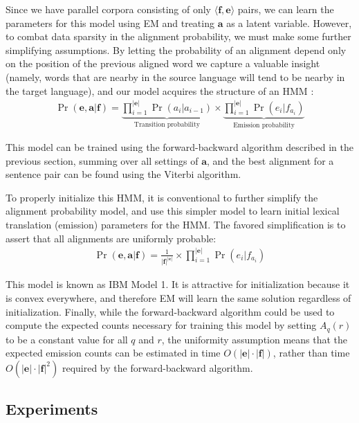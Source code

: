 \noindent Since we have parallel corpora consisting of only $\langle
\textbf{f}, \textbf{e} \rangle$ pairs, we can learn the parameters for
this model using EM and treating $\textbf{a}$ as a latent variable.
However, to combat data sparsity in the alignment probability, we must
make some further simplifying assumptions.  By letting the probability
of an alignment depend only on the position of the previous aligned
word we capture a valuable insight (namely, words that are nearby in
the source language will tend to be nearby in the target language),
and our model acquires the structure of an HMM \cite{Vogel_1996}:
\begin{align}
\Pr(\textbf{e}, \textbf{a} | \textbf{f}) = \underbrace{\prod_{i=1}^{|\textbf{e}|} \Pr(a_i | a_{i-1})}_{\textrm{Transition probability}} \times \underbrace{\prod_{i=1}^{|\textbf{e}|} \Pr(e_i|f_{a_i})}_{\textrm{Emission probability}} 
\end{align}

\noindent This model can be trained using the forward-backward
algorithm described in the previous section, summing over all settings
of $\textbf{a}$, and the best alignment for a sentence pair can be
found using the Viterbi algorithm.

To properly initialize this HMM, it is conventional to further
simplify the alignment probability model, and use this simpler model
to learn initial lexical translation (emission) parameters for the
HMM.  The favored simplification is to assert that all alignments are
uniformly probable:
\begin{align}
\Pr(\textbf{e}, \textbf{a} | \textbf{f}) = \frac{1}{|\textbf{f}|^{|\textbf{e}|}} \times \prod_{i=1}^{|\textbf{e}|} \Pr(e_i|f_{a_i}) 
\end{align}

\noindent This model is known as IBM Model 1.  It is attractive for
initialization because it is convex everywhere, and therefore EM will
learn the same solution regardless of initialization.  Finally, while
the forward-backward algorithm could be used to compute the expected
counts necessary for training this model by setting $A_q(r)$ to be a
constant value for all $q$ and $r$, the uniformity assumption means
that the expected emission counts can be estimated in time
$O(|\textbf{e}| \cdot |\textbf{f}|)$, rather than time $O(|\textbf{e}|
\cdot |\textbf{f}|^2)$ required by the forward-backward algorithm.

\subsection{Experiments}

